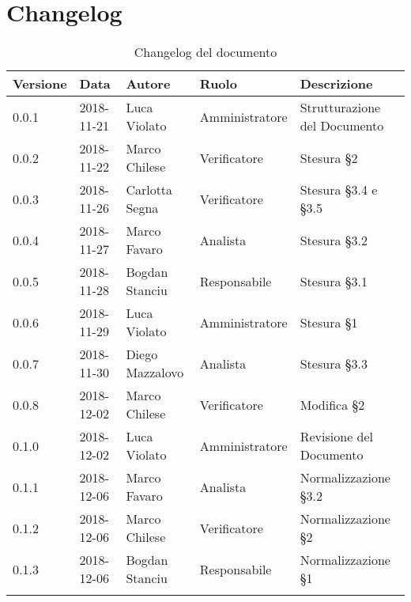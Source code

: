 \section{Changelog}

\begin{center}
\begin{longtable}[c]{|m{}|m{}|m{}|m{}|p{}|}
\hline
\textbf{Versione} & \textbf{Data} & \textbf{Autore} & \textbf{Ruolo} & \textbf{Descrizione} \\
\hline \hline
\endfirsthead
0.0.1 & 2018-11-21 & Luca Violato & Amministratore & Strutturazione del Documento \\
\hline
0.0.2 & 2018-11-22 & Marco Chilese & Verificatore & Stesura §2 \\
\hline
0.0.3 & 2018-11-26 & Carlotta Segna & Verificatore & Stesura §3.4 e §3.5 \\
\hline
0.0.4 & 2018-11-27 & Marco Favaro & Analista & Stesura §3.2 \\
\hline
0.0.5 & 2018-11-28 & Bogdan Stanciu & Responsabile & Stesura §3.1\\
\hline
0.0.6 & 2018-11-29 & Luca Violato & Amministratore & Stesura §1 \\
\hline
0.0.7 & 2018-11-30 & Diego Mazzalovo & Analista & Stesura §3.3 \\
\hline
0.0.8 & 2018-12-02 & Marco Chilese & Verificatore & Modifica §2 \\
\hline
0.1.0 & 2018-12-02 & Luca Violato & Amministratore & Revisione del Documento\\
\hline
0.1.1 & 2018-12-06 & Marco Favaro & Analista & Normalizzazione §3.2\\
\hline
0.1.2 & 2018-12-06 & Marco Chilese & Verificatore & Normalizzazione §2\\
\hline
0.1.3 & 2018-12-06 & Bogdan Stanciu & Responsabile & Normalizzazione §1\\
\hline
\caption{Changelog del documento}
\end{longtable}
\end{center}
